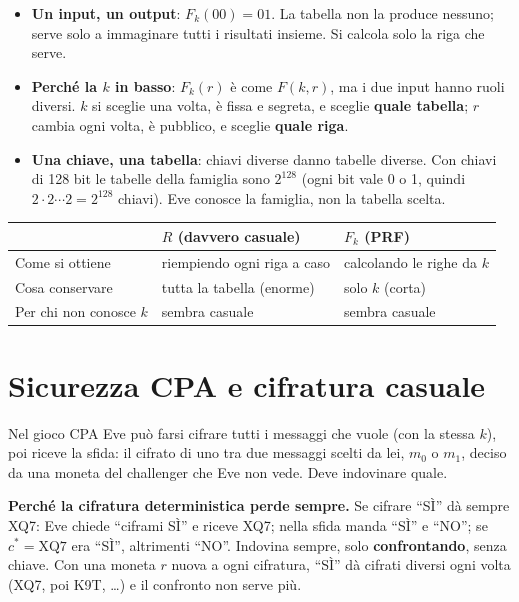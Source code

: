 \begin{itemize}
  \item \textbf{Un input, un output}: \(F_k(00) = 01\). La tabella non la produce nessuno; serve solo a immaginare tutti i risultati insieme. Si calcola solo la riga che serve.
  \item \textbf{Perché la \(k\) in basso}: \(F_k(r)\) è come \(F(k, r)\), ma i due input hanno ruoli diversi. \(k\) si sceglie una volta, è fissa e segreta, e sceglie \textbf{quale tabella}; \(r\) cambia ogni volta, è pubblico, e sceglie \textbf{quale riga}.
  \item \textbf{Una chiave, una tabella}: chiavi diverse danno tabelle diverse. Con chiavi di 128 bit le tabelle della famiglia sono \(2^{128}\) (ogni bit vale 0 o 1, quindi \(2 \cdot 2 \cdots 2 = 2^{128}\) chiavi). Eve conosce la famiglia, non la tabella scelta.
\end{itemize}

\begin{center}
\begin{tabular}{lll}
\toprule
 & \(R\) (davvero casuale) & \(F_k\) (PRF) \\
\midrule
Come si ottiene & riempiendo ogni riga a caso & calcolando le righe da \(k\) \\
Cosa conservare & tutta la tabella (enorme) & solo \(k\) (corta) \\
Per chi non conosce \(k\) & sembra casuale & sembra casuale \\
\bottomrule
\end{tabular}
\end{center}

\section{Sicurezza CPA e cifratura casuale}

\begin{inbreve}
Nel gioco CPA Eve può farsi cifrare tutti i messaggi che vuole (con la stessa \(k\)), poi riceve la sfida: il cifrato di uno tra due messaggi scelti da lei, \(m_0\) o \(m_1\), deciso da una moneta del challenger che Eve non vede. Deve indovinare quale.
\end{inbreve}

\begin{esempio}
\textbf{Perché la cifratura deterministica perde sempre.} Se cifrare ``SÌ'' dà sempre XQ7: Eve chiede ``ciframi SÌ'' e riceve XQ7; nella sfida manda ``SÌ'' e ``NO''; se \(c^* = \text{XQ7}\) era ``SÌ'', altrimenti ``NO''. Indovina sempre, solo \textbf{confrontando}, senza chiave. Con una moneta \(r\) nuova a ogni cifratura, ``SÌ'' dà cifrati diversi ogni volta (XQ7, poi K9T, \dots) e il confronto non serve più.
\end{esempio}

